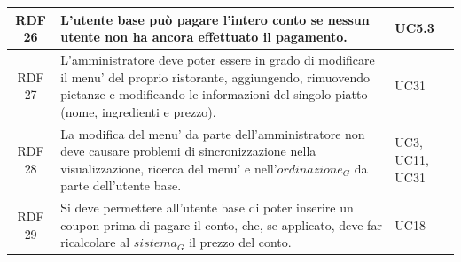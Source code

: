 \documentclass[12pt, oneside]{article}
\begin{document}
\begin{longtable}{|c|p{14cm}|p{2cm}|}
    \hline
    RDF 26& L'utente base può pagare l'intero conto se nessun utente non ha ancora effettuato il pagamento. & UC5.3 \\
    \hline
    RDF 27& L'amministratore deve poter essere in grado di modificare il menu' del proprio ristorante, aggiungendo, rimuovendo pietanze e modificando le informazioni del singolo piatto (nome, ingredienti e prezzo). & UC31 \\
    \hline
    RDF 28& La modifica del menu' da parte dell'amministratore non deve causare problemi di sincronizzazione nella visualizzazione, ricerca del menu' e nell'$\textit{ordinazione}_G$ da parte dell'utente base. &  UC3, UC11, UC31 \\
    \hline
    RDF 29& Si deve permettere all'utente base di poter inserire un coupon prima di pagare il conto, che, se applicato, deve far ricalcolare al $\textit{sistema}_G$ il prezzo del conto. & UC18 \\
    \hline


\end{longtable}
\end{document}
